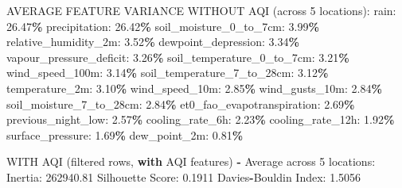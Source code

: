 \documentclass[
  letterpaper,
  DIV=11,
  numbers=noendperiod]{scrartcl}
\newenvironment{Shaded}{\begin{snugshade}}{\end{snugshade}}
\newcommand{\ControlFlowTok}[1]{\textcolor[rgb]{0.13,0.29,0.53}{\textbf{#1}}}
\newcommand{\DecValTok}[1]{\textcolor[rgb]{0.00,0.00,0.81}{#1}}
\newcommand{\FloatTok}[1]{\textcolor[rgb]{0.00,0.00,0.81}{#1}}
\newcommand{\NormalTok}[1]{#1}
\newcommand{\OperatorTok}[1]{\textcolor[rgb]{0.81,0.36,0.00}{\textbf{#1}}}
\begin{document}
\begin{Shaded}
\begin{Highlighting}[]
\NormalTok{AVERAGE FEATURE VARIANCE WITHOUT AQI (across }\DecValTok{5}\NormalTok{ locations):}
\NormalTok{  rain: }\FloatTok{26.47}\OperatorTok{\%}
\NormalTok{  precipitation: }\FloatTok{26.42}\OperatorTok{\%}
\NormalTok{  soil\_moisture\_0\_to\_7cm: }\FloatTok{3.99}\OperatorTok{\%}
\NormalTok{  relative\_humidity\_2m: }\FloatTok{3.52}\OperatorTok{\%}
\NormalTok{  dewpoint\_depression: }\FloatTok{3.34}\OperatorTok{\%}
\NormalTok{  vapour\_pressure\_deficit: }\FloatTok{3.26}\OperatorTok{\%}
\NormalTok{  soil\_temperature\_0\_to\_7cm: }\FloatTok{3.21}\OperatorTok{\%}
\NormalTok{  wind\_speed\_100m: }\FloatTok{3.14}\OperatorTok{\%}
\NormalTok{  soil\_temperature\_7\_to\_28cm: }\FloatTok{3.12}\OperatorTok{\%}
\NormalTok{  temperature\_2m: }\FloatTok{3.10}\OperatorTok{\%}
\NormalTok{  wind\_speed\_10m: }\FloatTok{2.85}\OperatorTok{\%}
\NormalTok{  wind\_gusts\_10m: }\FloatTok{2.84}\OperatorTok{\%}
\NormalTok{  soil\_moisture\_7\_to\_28cm: }\FloatTok{2.84}\OperatorTok{\%}
\NormalTok{  et0\_fao\_evapotranspiration: }\FloatTok{2.69}\OperatorTok{\%}
\NormalTok{  previous\_night\_low: }\FloatTok{2.57}\OperatorTok{\%}
\NormalTok{  cooling\_rate\_6h: }\FloatTok{2.23}\OperatorTok{\%}
\NormalTok{  cooling\_rate\_12h: }\FloatTok{1.92}\OperatorTok{\%}
\NormalTok{  surface\_pressure: }\FloatTok{1.69}\OperatorTok{\%}
\NormalTok{  dew\_point\_2m: }\FloatTok{0.81}\OperatorTok{\%}

\NormalTok{WITH AQI (filtered rows, }\ControlFlowTok{with}\NormalTok{ AQI features) }\OperatorTok{{-}}\NormalTok{ Average across }\DecValTok{5}\NormalTok{ locations:}
\NormalTok{  Inertia: }\FloatTok{262940.81}
\NormalTok{  Silhouette Score: }\FloatTok{0.1911}
\NormalTok{  Davies}\OperatorTok{{-}}\NormalTok{Bouldin Index: }\FloatTok{1.5056}


\end{Highlighting}
\end{Shaded}
\end{document}
